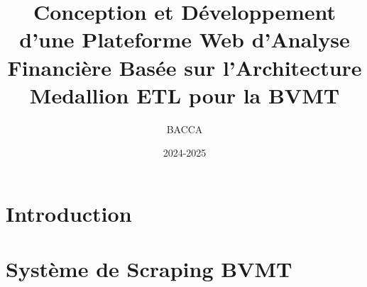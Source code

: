 \documentclass[11pt,a4paper]{book}
\title{Conception et Développement d'une Plateforme Web d'Analyse Financière Basée sur l'Architecture Medallion ETL pour la BVMT}
\author{BACCA}
\date{2024-2025}
\begin{document}
\maketitle

\tableofcontents

\chapter{Introduction}


\chapter{Système de Scraping BVMT}

\end{document}
